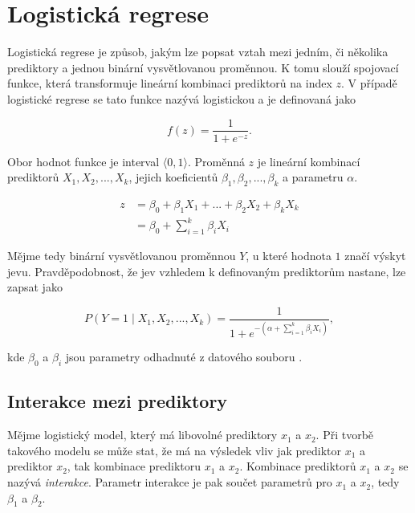 \newpage
\section{Logistická regrese}
Logistická regrese je způsob, jakým lze popsat vztah mezi jedním, či několika prediktory a jednou binární vysvětlovanou 
proměnnou. K tomu slouží spojovací funkce, která transformuje lineární kombinaci prediktorů na index $z$. V případě
logistické regrese se tato funkce nazývá logistickou a je definovaná jako

\begin{equation}
    \label{eq:logisticka_funkce}
    f(z) = \frac{1}{1 + e^{-z}}.
\end{equation}

Obor hodnot funkce je interval $\langle 0, 1 \rangle$. Proměnná $z$ je lineární kombinací prediktorů  $X_1, X_2, ..., X_k$, 
jejich koeficientů $\beta_1, \beta_2, ..., \beta_k$ a parametru $\alpha$.

\begin{equation}
    \label{eq:linearni_kombinace_z}
    \begin{split}
        z &= \beta_0 + \beta_1 X_1 + ... + \beta_2 X_2 +\beta_k X_k \\
          &= \beta_0 + \sum_{i=1}^k \beta_i X_i
    \end{split}
\end{equation}

Mějme tedy binární vysvětlovanou proměnnou $Y$, u které hodnota $1$ značí výskyt jevu. Pravděpodobnost, že jev
vzhledem k definovaným prediktorům nastane, lze zapsat jako

\begin{equation}
    \label{eq:pravdepodobnost_y}
    P(Y = 1 \mid X_1, X_2, ..., X_k) = \frac{1}{1 + e^{- \left( \alpha + \sum_{i=1}^k \beta_i X_i \right) }},
\end{equation}

kde $\beta_0$ a $\beta_i$ jsou parametry odhadnuté z datového souboru \cite{kleinbaum_logistic_2010}.

\subsection{Interakce mezi prediktory}
Mějme logistický model, který má libovolné prediktory $x_1$ a $x_2$. Při tvorbě takového modelu se může stat, že má na výsledek vliv jak prediktor $x_1$ a prediktor
$x_2$, tak kombinace prediktoru $x_1$ a $x_2$. Kombinace prediktorů $x_1$ a $x_2$ se nazývá \textit{interakce}. Parametr interakce je pak součet parametrů pro $x_1$ a $x_2$,
tedy $\beta_1$ a $\beta_2$.

